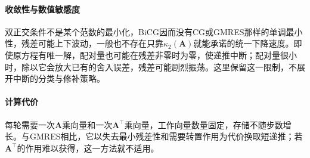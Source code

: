 \paragraph{收敛性与数值敏感度}
双正交条件不是某个范数的最小化，BiCG因而没有CG或GMRES那样的单调最小性，残差可能上下波动，一般也不存在只靠$\kappa_2(\bm A)$就能承诺的统一下降速度。即使原方程有唯一解，配对量也可能在残差非零时为零，使递推中断；配对量很小时，除以它会放大已有的舍入误差，残差可能剧烈振荡。这里保留这一限制，不展开中断的分类与修补策略。

\paragraph{计算代价}
每轮需要一次$\bm A$乘向量和一次$\bm A^\top$乘向量，工作向量数量固定，存储不随步数增长。与GMRES相比，它以失去最小残差性和需要转置作用为代价换取短递推；若$\bm A^\top$的作用难以获得，这一方法就不适用。
